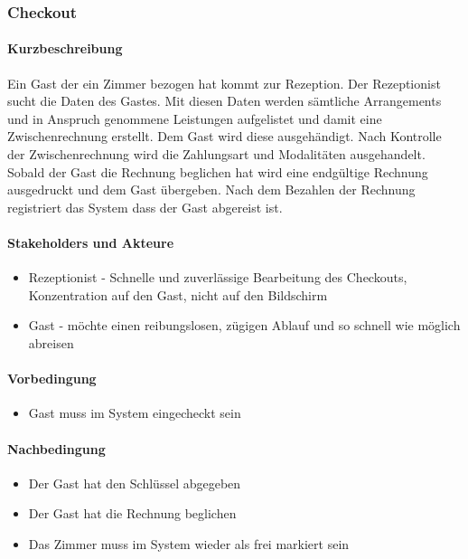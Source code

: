 \subsubsection{Checkout}

\paragraph{Kurzbeschreibung}
   Ein \Gls{Gast} der ein \Gls{Zimmer} bezogen hat kommt zur Rezeption.
   Der \Gls{Rezeptionist} sucht die Daten des \Gls{Gast}es. Mit diesen Daten
   werden sämtliche Arrangements und in Anspruch genommene
   Leistungen aufgelistet und damit eine \Gls{Zwischenrechnung} erstellt.
   Dem \Gls{Gast} wird diese ausgehändigt. Nach Kontrolle der
   \Gls{Zwischenrechnung} wird die Zahlungsart und Modalitäten ausgehandelt.
   Sobald der \Gls{Gast} die \Gls{Rechnung} beglichen  hat wird eine endgültige
   Rechnung ausgedruckt und dem \Gls{Gast} übergeben.
   Nach dem  Bezahlen der \Gls{Rechnung} registriert das System dass der
   \Gls{Gast} abgereist ist.

\paragraph{Stakeholders und Akteure}
\begin{itemize}
	\item \Gls{Rezeptionist} - Schnelle und zuverlässige Bearbeitung des
	\Gls{Checkout}s, Konzentration auf den \Gls{Gast}, nicht auf den Bildschirm
	\item \Gls{Gast} - möchte einen reibungslosen, zügigen Ablauf und so schnell
	wie möglich abreisen
\end{itemize}

\paragraph{Vorbedingung}
\begin{itemize}
	\item Gast muss im System eingecheckt sein
\end{itemize}

\paragraph{Nachbedingung}
\begin{itemize}
	\item Der Gast hat den Schlüssel abgegeben
	\item Der Gast hat die Rechnung beglichen
	\item Das Zimmer muss im System wieder als frei markiert sein
\end{itemize}

